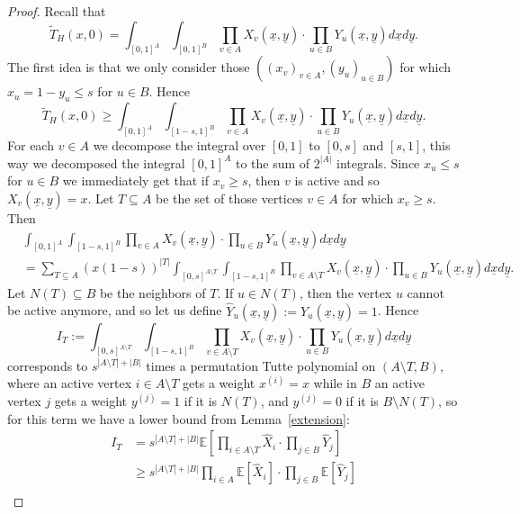 \documentclass[12pt,a4paper]{amsart}
\numberwithin{equation}{section}
\theoremstyle{plain}
\theoremstyle{definition}
\newcommand{\1}{\textbf{1}}
\newcommand{\E}{\mathbb{E}}
\begin{document}
\begin{proof}
Recall that
$$\widetilde{T}_H(x,0)=\int_{[0,1]^A}\int_{[0,1]^B}\prod_{v\in A}X_v(\underline{x},\underline{y})\cdot \prod_{u\in B}Y_u(\underline{x},\underline{y}) d\underline{x}d\underline{y}.$$
The first idea is that we only consider those $((x_v)_{v\in A},(y_u)_{u\in B})$ for which $x_u=1-y_u\leqslant   s$ for $u\in B$. Hence
$$\widetilde{T}_H(x,0)\geqslant \int_{[0,1]^A}\int_{[1-s,1]^B}\prod_{v\in A}X_v(\underline{x},\underline{y})\cdot \prod_{u\in B}Y_u(\underline{x},\underline{y}) d\underline{x}d\underline{y}.$$
For each $v\in A$ we decompose the integral over $[0,1]$ to $[0,s]$ and $[s,1]$, this way we decomposed the integral $[0,1]^A$ to the sum of $2^{|A|}$ integrals. Since $x_u\leqslant   s$ for $u\in B$ we immediately get that if $x_v\geqslant s$, then $v$ is active and so $X_v(\underline{x},\underline{y})=x$. 
Let $T\subseteq A$ be the set of those vertices $v\in A$ for which $x_v\geqslant s$. Then
\begin{align*}
&\int_{[0,1]^A}\int_{[1-s,1]^B}\prod_{v\in A}X_v(\underline{x},\underline{y})\cdot \prod_{u\in B}Y_u(\underline{x},\underline{y}) d\underline{x}d\underline{y}\\
&=\sum_{T\subseteq A}(x(1-s))^{|T|}\int_{[0,s]^{A\setminus T}}\int_{[1-s,1]^B}\prod_{v\in A\setminus T}X_v(\underline{x},\underline{y})\cdot \prod_{u\in B}Y_u(\underline{x},\underline{y}) d\underline{x}d\underline{y}.
\end{align*}
Let $N(T)\subseteq B$ be the neighbors of $T$. If $u\in N(T)$, then  the vertex $u$ cannot be active anymore, and so let us define $\widehat{Y}_u(\underline{x},\underline{y}):=Y_u(\underline{x},\underline{y})=1$. Hence
$$I_T:=\int_{[0,s]^{A\setminus T}}\int_{[1-s,1]^B}\prod_{v\in A\setminus T}X_v(\underline{x},\underline{y})\cdot \prod_{u\in B}Y_u(\underline{x},\underline{y}) d\underline{x}d\underline{y}$$
corresponds to $s^{|A\setminus T|+|B|}$ times a permutation Tutte polynomial on $(A\setminus T,B)$, where an active vertex $i\in A\setminus T$ gets a weight $x^{(i)}=x$ while in $B$ an active vertex $j$ gets a weight $y^{(j)}=1$ if it is $N(T)$, and $y^{(j)}=0$ if it is $B\setminus N(T)$, so for this term we have a lower bound from Lemma~\ref{extension}:
\begin{align*}
I_T&=s^{|A\setminus T|+|B|}\E\left[\prod_{i\in A\setminus T}\widehat{X}_i\cdot \prod_{j\in B}\widehat{Y}_j\right]\\
&\geqslant s^{|A\setminus T|+|B|}\prod_{i\in A}\E[\widehat{X}_i]\cdot \prod_{j\in B}\E [\widehat{Y}_j]\\

\end{align*}
\end{proof}
\end{document}
